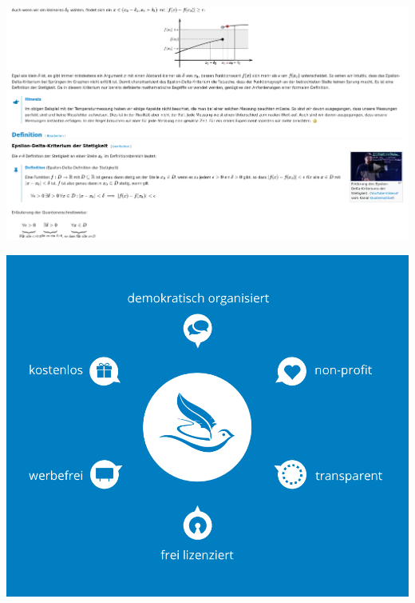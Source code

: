 \documentclass[aspectratio=169]{beamer}
\begin{document}
\begin{frame}
    \centering
    \includegraphics[height=0.9\textheight]{mfnf.png}
\end{frame}

\begingroup
{}
\begin{frame}
    \centering
    \includegraphics[height=\textheight]{serlo-vision.png}
\end{frame}
\endgroup
\end{document}
